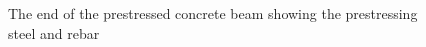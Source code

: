 \documentclass[
  letterpaper,
  DIV=11,
  numbers=noendperiod]{scrreprt}
\theoremstyle{definition}
\theoremstyle{remark}
\begin{document}
\begin{figure}


\caption{\label{fig-9.9}The end of the prestressed concrete beam showing
the prestressing steel and rebar}

\end{figure}%
\end{document}
